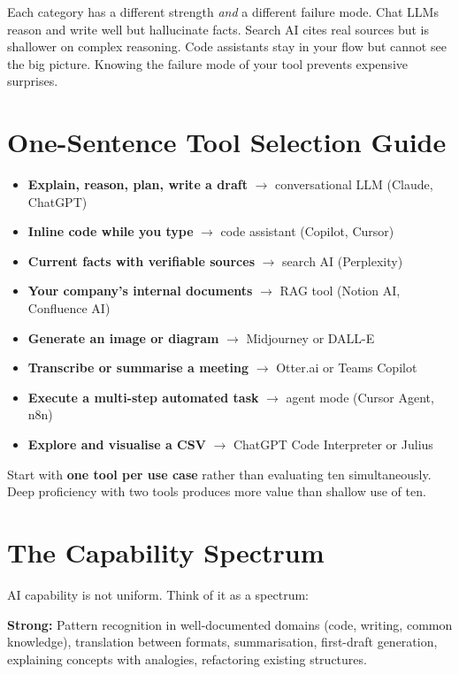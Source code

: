 Each category has a different strength \emph{and} a different failure mode.
Chat LLMs reason and write well but hallucinate facts.
Search AI cites real sources but is shallower on complex reasoning.
Code assistants stay in your flow but cannot see the big picture.
Knowing the failure mode of your tool prevents expensive surprises.

\section{One-Sentence Tool Selection Guide}
\label{sec:choosing}

\begin{itemize}
  \item \textbf{Explain, reason, plan, write a draft} $\to$ conversational LLM (Claude, ChatGPT)
  \item \textbf{Inline code while you type} $\to$ code assistant (Copilot, Cursor)
  \item \textbf{Current facts with verifiable sources} $\to$ search AI (Perplexity)
  \item \textbf{Your company's internal documents} $\to$ RAG tool (Notion AI, Confluence AI)
  \item \textbf{Generate an image or diagram} $\to$ Midjourney or DALL-E
  \item \textbf{Transcribe or summarise a meeting} $\to$ Otter.ai or Teams Copilot
  \item \textbf{Execute a multi-step automated task} $\to$ agent mode (Cursor Agent, n8n)
  \item \textbf{Explore and visualise a CSV} $\to$ ChatGPT Code Interpreter or Julius
\end{itemize}

\begin{tipbox}
Start with \textbf{one tool per use case} rather than evaluating ten simultaneously.
Deep proficiency with two tools produces more value than shallow use of ten.
\end{tipbox}

\section{The Capability Spectrum}
\label{sec:spectrum}

AI capability is not uniform. Think of it as a spectrum:

\textbf{Strong:} Pattern recognition in well-documented domains (code, writing, common
knowledge), translation between formats, summarisation, first-draft generation, explaining
concepts with analogies, refactoring existing structures.

